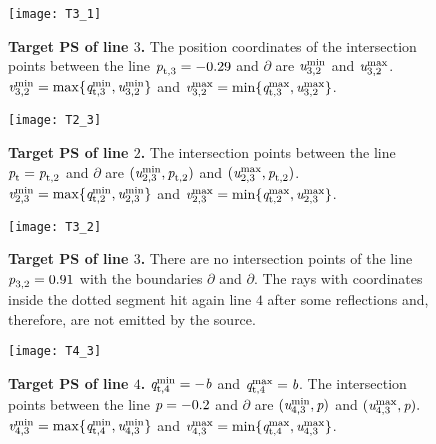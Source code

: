 \begin{figure}
\begin{minipage}[t]{.48\textwidth}
   \centering
   \texttt{[image: T3\_1]}
   \caption{\footnotesize{\textbf{Target PS of line $3$.}
  The position coordinates of the intersection points between  the line $ \textit{p}_{\textrm{t,} \textit{$3$}} = -0.29$ and
  $\partial$ are $\textit{u}_{3,2}^{\textrm{min}}$ and $\textit{u}_{3,2}^{\textrm{max}}$.
   $\textit{v}_{3,2 }^{\textrm{min}} = \max\{\textit{q}_{\textrm{t,} \textit{$3$}}^{\textrm{min}}, \textit{u}_{3,2}^{\textrm{min}}\}$ and
   $\textit{v}_{3,2 }^{\textrm{max}} = \min\{\textit{q}_{\textrm{t,} \textit{$3$}}^{\textrm{max}}, \textit{u}_{3,2}^{\textrm{max}}\}$.\\}}
   \label{fig:T31}
 \end{minipage}\hfill
 \begin{minipage}[t]{.48\textwidth}
  \centering
   \texttt{[image: T2\_3]}
\caption{\footnotesize{\textbf{Target PS of line $2$.}
 The intersection points between the line $\textit{p}_{\textrm{t} \textit{}} = \textit{p}_{\textrm{t,} \textit{$2$}}$ and $\partial$ are
 $(\textit{u}_{2,3}^{\textrm{min}}, \textit{p}_{\textrm{t,} \textit{$2$}})$ and $(\textit{u}_{2,3}^{\textrm{max}}, \textit{p}_{\textrm{t,} \textit{$2$}})$.
 $\textit{v}_{2,3 }^{\textrm{min}} = \max\{\textit{q}_{\textrm{t,} \textit{$2$}}^{\textrm{min}}, \textit{u}_{2,3}^{\textrm{min}}\}$ and
 $\textit{v}_{2,3 }^{\textrm{max}} = \min\{\textit{q}_{\textrm{t,} \textit{$2$}}^{\textrm{max}}, \textit{u}_{2,3}^{\textrm{max}}\}$.\\}}
    \label{fig:T23}
 \end{minipage}\hfill
  \begin{minipage}[t]{.48\textwidth}
   \centering
   \texttt{[image: T3\_2]}
   \caption{\footnotesize{\textbf{Target PS of line $3$.} 
  There are no intersection points of the line $\textit{p}_{\textrm{$3$,} \textit{$2$}}=0.91$
 with the boundaries $\partial$ and $\partial$.
  The rays with coordinates inside the dotted segment hit again line $4$ after some reflections and, therefore, are not emitted by the source.}}
    \label{fig:T32}
 \end{minipage}\hfill
 \begin{minipage}[t]{.48\textwidth}
   \centering
   \texttt{[image: T4\_3]}
   \caption{\footnotesize{\textbf{Target PS of line $4$.} $\textit{q}_{\textrm{t,} \textit{$4$}}^{\textrm{min}} = -\textit{b}$ and $\textit{q}_{\textrm{t,} \textit{$4$}}^{\textrm{max}}= \textit{b}$.
  The intersection points between the line $\textit{p} = -0.2$ and $\partial$ are $(\textit{u}_{4,3}^{\textrm{min}}, \textit{p})$ and $(\textit{u}_{4,3}^{\textrm{max}}, \textit{p}).$ $\textit{v}_{4,3}^{\textrm{min}} = \max\{\textit{q}_{\textrm{t,} \textit{$4$}}^{\textrm{min}}, \textit{u}_{4,3}^{\textrm{min}}\}$
  and $\textit{v}_{4,3}^{\textrm{max}} = \min\{\textit{q}_{\textrm{t,} \textit{$4$}}^{\textrm{max}}, \textit{u}_{4,3}^{\textrm{max}}\}$.}}
   \label{fig:T43}
\end{minipage}\hfill
\end{figure}
